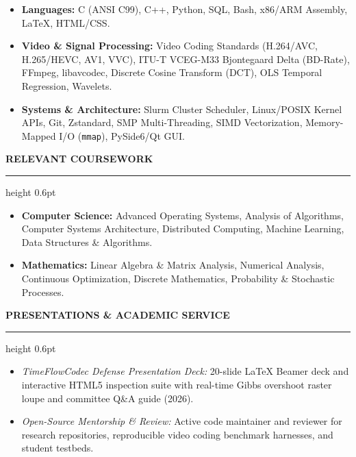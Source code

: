 \documentclass[11pt,letterpaper]{article}
\newcommand{\cvsection}[1]{%
  \vspace{10pt}%
  {\noindent\large\bfseries\MakeUppercase{#1}}\\[-2pt]%
  \hrule height 0.6pt%
  \vspace{5pt}%
}
\begin{document}
\begin{itemize}
    \setlength{\itemsep}{1pt}
    \setlength{\parskip}{0pt}
    \setlength{\parsep}{0pt}
    \item \textbf{Languages:} C (ANSI C99), C++, Python, SQL, Bash, x86/ARM Assembly, LaTeX, HTML/CSS.
    \item \textbf{Video \& Signal Processing:} Video Coding Standards (H.264/AVC, H.265/HEVC, AV1, VVC), ITU-T VCEG-M33 Bjontegaard Delta (BD-Rate), FFmpeg, libavcodec, Discrete Cosine Transform (DCT), OLS Temporal Regression, Wavelets.
    \item \textbf{Systems \& Architecture:} Slurm Cluster Scheduler, Linux/POSIX Kernel APIs, Git, Zstandard, SMP Multi-Threading, SIMD Vectorization, Memory-Mapped I/O (\texttt{mmap}), PySide6/Qt GUI.
\end{itemize}

\cvsection{Relevant Coursework}
\begin{itemize}
    \setlength{\itemsep}{1pt}
    \setlength{\parskip}{0pt}
    \setlength{\parsep}{0pt}
    \item \textbf{Computer Science:} Advanced Operating Systems, Analysis of Algorithms, Computer Systems Architecture, Distributed Computing, Machine Learning, Data Structures \& Algorithms.
    \item \textbf{Mathematics:} Linear Algebra \& Matrix Analysis, Numerical Analysis, Continuous Optimization, Discrete Mathematics, Probability \& Stochastic Processes.
\end{itemize}

\cvsection{Presentations \& Academic Service}

\begin{itemize}
    \setlength{\itemsep}{1pt}
    \setlength{\parskip}{0pt}
    \setlength{\parsep}{0pt}
    \item \textit{TimeFlowCodec Defense Presentation Deck:} 20-slide LaTeX Beamer deck and interactive HTML5 inspection suite with real-time Gibbs overshoot raster loupe and committee Q\&A guide (2026).
    \item \textit{Open-Source Mentorship \& Review:} Active code maintainer and reviewer for research repositories, reproducible video coding benchmark harnesses, and student testbeds.
\end{itemize}
\end{document}
